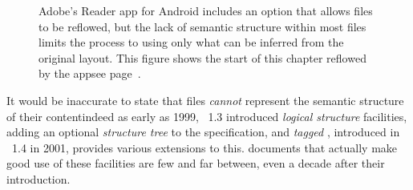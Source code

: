 
\begin{figure}
\caption[Reflowed text of a \textsc{pdf} file]{Adobe's Reader app for Android includes an option that allows \pdf{} files to be reflowed, but the lack of semantic structure within most \pdf{} files limits the process to using only what can be inferred from the original layout. This figure shows the start of this chapter reflowed by the app\ed{}see page~\pageref{ch:intro}.}
\label{fig:acrobatreflow}
\end{figure}

It would be inaccurate to state that \pdf{} files \emph{cannot} represent the semantic structure of their content\ed indeed as early as 1999, \pdf{}~1.3 introduced \emph{logical structure} facilities,\cite{Adobe2001} adding an optional \emph{structure tree} to the \pdf{} specification, and \emph{tagged \pdf{}}, introduced in \pdf{}~1.4 in 2001, provides various extensions to this. \pdf{} documents that actually make good use of these facilities are few and far between, even a decade after their introduction.

